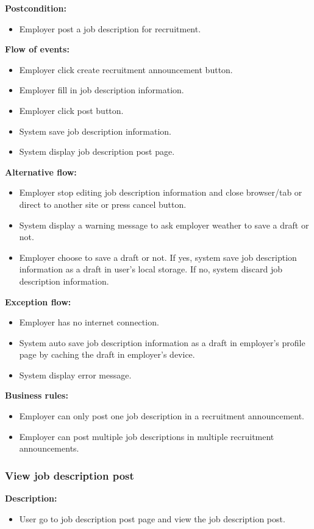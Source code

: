 \documentclass[a4paper]{article}
\begin{document}
\textbf{Postcondition:}
\begin{itemize}
    \item Employer post a job description for recruitment.
\end{itemize}

\textbf{Flow of events:}
\begin{itemize}
    \item Employer click create recruitment announcement button.
    \item Employer fill in job description information.
    \item Employer click post button.
    \item System save job description information.
    \item System display job description post page.
\end{itemize}

\textbf{Alternative flow:}
\begin{itemize}
    \item Employer stop editing job description information and close browser/tab or direct to another site or press cancel button.
    \item System display a warning message to ask employer weather to save a draft or not.
    \item Employer choose to save a draft or not. If yes, system save job description information as a draft in user's local storage. If no, system discard job description information.
\end{itemize}

\textbf{Exception flow:}
\begin{itemize}
    \item Employer has no internet connection.
    \item System auto save job description information as a draft in employer's profile page by caching the draft in employer's device.
    \item System display error message.
\end{itemize}

\textbf{Business rules:}
\begin{itemize}
    \item Employer can only post one job description in a recruitment announcement.
    \item Employer can post multiple job descriptions in multiple recruitment announcements.
\end{itemize}

\subsubsection{View job description post}
\textbf{Description:}
\begin{itemize}
    \item User go to job description post page and view the job description post.
\end{itemize}
\end{document}

